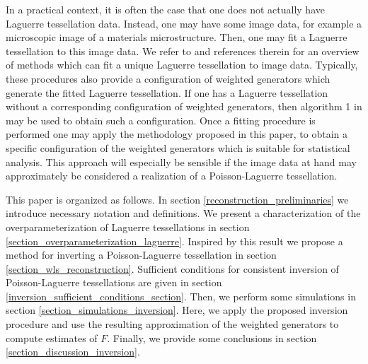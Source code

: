 \documentclass{article}
\theoremstyle{plain}
\theoremstyle{remark}
\theoremstyle{definition}
\begin{document}
In a practical context, it is often the case that one does not actually have Laguerre tessellation data. Instead, one may have some image data, for example a microscopic image of a materials microstructure. Then, one may fit a Laguerre tessellation to this image data. We refer to \cite{Alpers2025} and references therein for an overview of methods which can fit a unique Laguerre tessellation to image data. Typically, these procedures also provide a configuration of weighted generators which generate the fitted Laguerre tessellation. If one has a Laguerre tessellation without a corresponding configuration of weighted generators, then algorithm 1 in \cite{Duan2014} may be used to obtain such a configuration. Once a fitting procedure is performed one may apply the methodology proposed in this paper, to obtain a specific configuration of the weighted generators which is suitable for statistical analysis. This approach will especially be sensible if the image data at hand may approximately be considered a realization of a Poisson-Laguerre tessellation.


This paper is organized as follows. In section \ref{reconstruction_preliminaries} we introduce necessary notation and definitions. We present a characterization of the overparameterization of Laguerre tessellations in section \ref{section_overparameterization_laguerre}. Inspired by this result we propose a method for inverting a Poisson-Laguerre tessellation in section \ref{section_wls_reconstruction}. Sufficient conditions for consistent inversion of Poisson-Laguerre tessellations are given in section \ref{inversion_sufficient_conditions_section}. Then, we perform some simulations in section \ref{section_simulations_inversion}. Here, we apply the proposed inversion procedure and use the resulting approximation of the weighted generators to compute estimates of $F$. Finally, we provide some conclusions in section \ref{section_discussion_inversion}.
\end{document}
